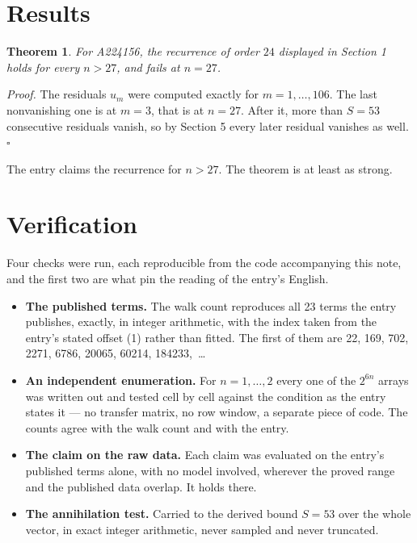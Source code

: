 \documentclass[11pt]{article}
\newtheorem{theorem}{Theorem}
\theoremstyle{definition}
\begin{document}
\section{Results}

\begin{theorem} For A224156, the recurrence of order $24$ displayed in Section 1 holds for every $n > 27$, and fails at $n = 27$.\end{theorem}

{\itshape Proof.} The residuals $u_m$ were computed exactly for $m = 1,\dots,106$. The last nonvanishing one is at $m = 3$, that is at $n = 27$. After it, more than $S = 53$ consecutive residuals vanish, so by Section 5 every later residual vanishes as well. $\square$

The entry claims the recurrence for $n > 27$. The theorem is at least as strong.

\section{Verification}

Four checks were run, each reproducible from the code accompanying this note, and the first two are what pin the reading of the entry's English.

\begin{itemize}

\item {\bfseries The published terms.} The walk count reproduces all 23 terms the entry publishes, exactly, in integer arithmetic, with the index taken from the entry's stated offset (1) rather than fitted. The first of them are 22, 169, 702, 2271, 6786, 20065, 60214, 184233,~\dots

\item {\bfseries An independent enumeration.} For $n = 1,\dots,2$ every one of the $2^{6n}$ arrays was written out and tested cell by cell against the condition as the entry states it --- no transfer matrix, no row window, a separate piece of code. The counts agree with the walk count and with the entry.

\item {\bfseries The claim on the raw data.} Each claim was evaluated on the entry's published terms alone, with no model involved, wherever the proved range and the published data overlap. It holds there.

\item {\bfseries The annihilation test.} Carried to the derived bound $S = 53$ over the whole vector, in exact integer arithmetic, never sampled and never truncated.

\end{itemize}
\end{document}
